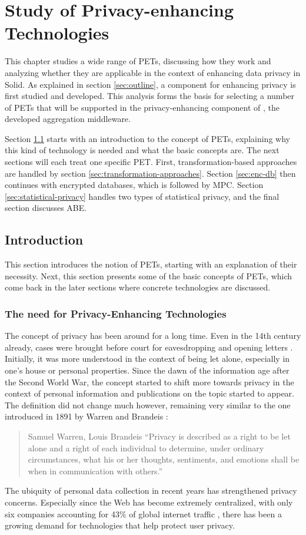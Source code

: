 \chapter{Study of Privacy-enhancing Technologies}
\label{cha:analysis}
This chapter studies a wide range of \gls{PETs}, discussing how they work and analyzing whether they are applicable in the context of enhancing data privacy in Solid. As explained in section \ref{sec:outline}, a component for enhancing privacy is first studied and developed. This analysis forms the basis for selecting a number of \gls{PETs} that will be supported in the privacy-enhancing component of \middleware{}, the developed aggregation middleware. 

Section \ref{sec:pets} starts with an introduction to the concept of \gls{PETs}, explaining why this kind of technology is needed and what the basic concepts are. The next sections will each treat one specific PET. First, transformation-based approaches are handled by section \ref{sec:transformation-approaches}. Section \ref{sec:enc-db} then continues with encrypted databases, which is followed by \acrlong{MPC}. Section \ref{sec:statistical-privacy} handles two types of statistical privacy, and the final section discusses \acrlong{ABE}.

\section{Introduction}
\label{sec:pets}
This section introduces the notion of \gls{PETs}, starting with an explanation of their necessity. Next, this section presents some of the basic concepts of \gls{PETs}, which come back in the later sections where concrete technologies are discussed.
\subsection{The need for Privacy-Enhancing Technologies}
The concept of privacy has been around for a long time. Even in the 14th century already, cases were brought before court for eavesdropping and opening letters \citep{privacy-history}. Initially, it was more understood in the context of being let alone, especially in one's house or personal properties. Since the dawn of the information age after the Second World War, the concept started to shift more towards privacy in the context of personal information and publications on the topic started to appear. The definition did not change much however, remaining very similar to the one introduced in 1891 by Warren and Brandeis \citep{privacy-history}:
\newpage
\begin{quote}{Samuel Warren, Louis Brandeis}
    ``Privacy is described as a right to be let alone and a right of each individual  to  determine,  under  ordinary  circumstances,  what  his  or  her  thoughts, sentiments, and emotions shall be when in communication with others.''
\end{quote}
\noindent The ubiquity of personal data collection in recent years has strengthened privacy concerns. Especially since the Web has become extremely centralized, with only six companies accounting for 43\% of global internet traffic \citep{internet-report}, there has been a growing demand for technologies that help protect user privacy.

